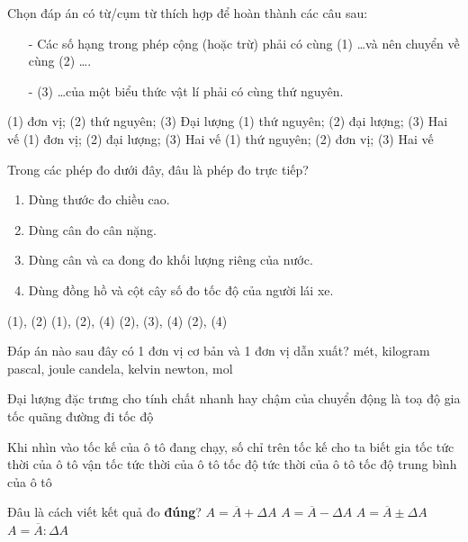 \begin{ex}
	Chọn đáp án có từ/cụm từ thích hợp để hoàn thành các câu sau:
	\begin{itemize}
		\item[-] Các số hạng trong phép cộng (hoặc trừ) phải có cùng (1) \dots và nên chuyển về cùng (2) \dots.
		\item[-] (3) \dots của một biểu thức vật lí phải có cùng thứ nguyên.
	\end{itemize}
	\choice
	{(1) đơn vị; (2) thứ nguyên; (3)  Đại lượng}
	{(1) thứ nguyên; (2) đại lượng; (3) Hai vế}
	{(1) đơn vị; (2) đại lượng; (3) Hai vế}
	{\True (1) thứ nguyên; (2) đơn vị; (3) Hai vế}
	\loigiai{}
\end{ex}
\begin{ex}
	Trong các phép đo dưới đây, đâu là phép đo trực tiếp?
	\begin{enumerate}[label=(\arabic*)]
		\item Dùng thước đo chiều cao.
		\item Dùng cân đo cân nặng.
		\item Dùng cân và ca đong đo khối lượng riêng của nước.
		\item Dùng đồng hồ và cột cây số đo tốc độ của người lái xe.
	\end{enumerate}
	\choice
	{\True (1), (2)}
	{(1), (2), (4)}
	{(2), (3), (4)}
	{(2), (4)}
	\loigiai{}
\end{ex}
\begin{ex}
	Đáp án nào sau đây có 1 đơn vị cơ bản và 1 đơn vị dẫn xuất?
	\choice
	{mét, kilogram}
	{pascal, joule}
	{candela, kelvin}
	{\True newton, mol}
	\loigiai{}
\end{ex}


\begin{ex}
	Đại lượng đặc trưng cho tính chất nhanh hay chậm của chuyển động là 
	\choice
	{toạ độ}
	{gia tốc}
	{quãng đường đi}
	{\True tốc độ}
	\loigiai{}
\end{ex}
\begin{ex}
	Khi nhìn vào tốc kế của ô tô đang chạy, số chỉ trên tốc kế cho ta biết
	\choice
	{gia tốc tức thời của ô tô}
	{vận tốc tức thời của ô tô}
	{\True tốc độ tức thời của ô tô}
	{tốc độ trung bình của ô tô}
	\loigiai{}
\end{ex}
\begin{ex}
	Đâu là cách viết kết quả đo \textbf{đúng}?
	\choice
	{$A=\overline{A}+\Delta A$}
	{$A=\overline{A}-\Delta A$}
	{\True $A=\overline{A}\pm\Delta A$}
	{$A=\overline{A}:\Delta A$}
	\loigiai{}
\end{ex}

